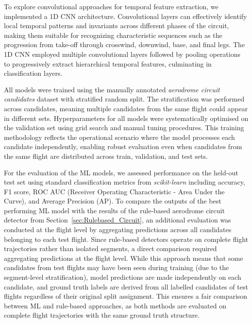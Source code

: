 \documentclass[
  manuscript=proceedings,  %
  layout=preprint,         %
  year=2025,
  volume=x,
]{extra/joas}
\begin{document}
To explore convolutional approaches for temporal feature extraction, we implemented a 1D CNN architecture. Convolutional layers can effectively identify local temporal patterns and invariants across different phases of the circuit, making them suitable for recognizing characteristic sequences such as the progression from take-off through crosswind, downwind, base, and final legs. The 1D CNN employed multiple convolutional layers followed by pooling operations to progressively extract hierarchical temporal features, culminating in classification layers.

All models were trained using the manually annotated \textit{aerodrome circuit candidates} dataset with stratified random split. The stratification was performed across candidates, meaning multiple candidates from the same flight could appear in different sets. Hyperparameters for all models were systematically optimised on the validation set using grid search and manual tuning procedures. This training methodology reflects the operational scenario where the model processes each candidate independently, enabling robust evaluation even when candidates from the same flight are distributed across train, validation, and test sets.

For the evaluation of the ML models, we assessed performance on the held-out test set using standard classification metrics from \textit{scikit-learn} including accuracy, F1 score, ROC AUC (Receiver Operating Characteristic - Area Under the Curve), and Average Precision (AP). To compare the outputs of the best performing ML model with the results of the rule-based aerodrome circuit detector from Section~\ref{sec:Rulebased_Circuit}, an additional evaluation was conducted at the flight level by aggregating predictions across all candidates belonging to each test flight. Since rule-based detectors operate on complete flight trajectories rather than isolated segments, a direct comparison required aggregating predictions at the flight level. While this approach means that some candidates from test flights may have been seen during training (due to the segment-level stratification), model predictions are made independently on each candidate, and ground truth labels are derived from all labelled candidates of test flights regardless of their original split assignment. This ensures a fair comparison between ML and rule-based approaches, as both methods are evaluated on complete flight trajectories with the same ground truth structure.
\end{document}
